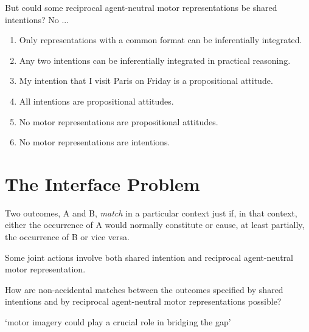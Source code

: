 \documentclass[11pt]{extarticle}
\begin{document}
\begin{multicols}{3}
But could some reciprocal agent-neutral motor representations be shared intentions?  No ...
\begin{enumerate}
\item Only representations with a common format can be inferentially integrated.

\item Any two intentions can be inferentially integrated in practical reasoning.

\item My intention that I visit Paris on Friday is a propositional attitude.

\item All intentions are propositional attitudes.

\item No motor representations are propositional attitudes.

\item No motor representations are intentions.
\end{enumerate}



\section{The Interface Problem}
Two  outcomes, A and B, \emph{match} in a particular context just if, in that context, either the occurrence of A would normally constitute or cause, at least partially, the occurrence of B or vice versa. 

Some joint actions involve both shared  intention and reciprocal agent-neutral motor representation.

How are non-accidental matches between the outcomes specified by shared intentions and by reciprocal agent-neutral motor representations possible?

`motor imagery could play a crucial role in bridging the gap'\citep{pacherie:2000_content}


\footnotesize 


\end{multicols}
\end{document}
